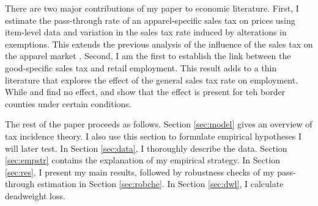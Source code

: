 \documentclass[12pt]{article}
\begin{document}
		There are two major contributions of my paper to economic literature. First, I estimate the pass-through rate of an apparel-specific sales tax on prices using item-level data and variation in the sales tax rate induced by alterations in exemptions. This extends the previous analysis of the influence of the sales tax on the apparel market \citep{besley, poterba}. Second, I am the first to establish the link between the good-specific sales tax and retail employment.  This result adds to a thin literature that explores the effect of the general sales tax rate on employment. While \citet{fox} and \citet{harden} find no effect, \citet{thompson} and \citet{rohlin} show that the effect is present for teh border counties under certain conditions.  
	
		
		The rest of the paper proceeds as follows. Section \ref{sec:model} gives an overview of tax incidence theory. I also use this section to formulate empirical hypotheses I will later test. In Section \ref{sec:data}, I thoroughly describe the data. Section \ref{sec:empstr} contains the explanation of my empirical strategy. In Section \ref{sec:res}, I present my main results, followed by robustness checks of my pass-through estimation in Section \ref{sec:robche}. In Section \ref{sec:dwl}, I calculate deadweight loss.
		
		
		
		
		
		 
		
		
\end{document}
